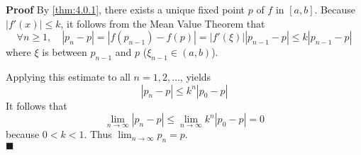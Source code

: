 \documentclass[main.tex]{subfiles}
\begin{document}
\par \noindent \textbf{Proof} By \ref{thm:4.0.1}, there exists a unique fixed point $p$ of $f$ in $[a, b]$. Because $|f'(x)|\le k$, it follows from the Mean Value Theorem that
\begin{equation}
    \forall n \ge 1, \quad |p_n - p| = |f(p_{n-1}) - f(p)| = |f'(\xi)||p_{n-1} - p| \le k |p_{n-1} - p|
\end{equation}
where $\xi$ is between $p_{n-1}$ and $p$ ($\xi_{n - 1} \in (a, b)$).
\par Applying this estimate to all $n = 1, 2, \ldots$, yields
\begin{equation} \label{eq:repeat}
    |p_n - p| \le k^n |p_0 - p|
\end{equation} 
It follows that 
\begin{equation}
    \lim_{n \rightarrow \infty} |p_n - p| \le \lim_{n \rightarrow \infty} k^n |p_0 - p| = 0 
\end{equation}
because $0 < k < 1$. Thus $\lim_{n \rightarrow \infty} p_n = p$.
\\ \null \hfill $\blacksquare$ 
\end{document}
